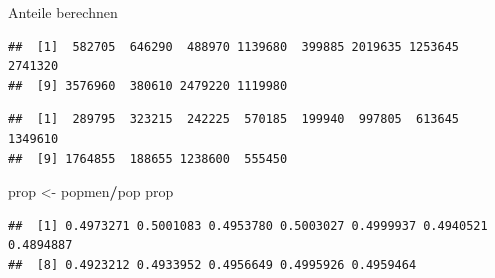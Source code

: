 \documentclass[ignorenonframetext,]{beamer}
\newenvironment{Shaded}{\begin{snugshade}}{\end{snugshade}}
\newcommand{\StringTok}[1]{\textcolor[rgb]{0.31,0.60,0.02}{#1}}
\newcommand{\OperatorTok}[1]{\textcolor[rgb]{0.81,0.36,0.00}{\textbf{#1}}}
\newcommand{\NormalTok}[1]{#1}
\begin{document}
\begin{frame}[fragile]{Anteile berechnen}

\begin{Shaded}
\end{Shaded}

\begin{verbatim}
##  [1]  582705  646290  488970 1139680  399885 2019635 1253645 2741320
##  [9] 3576960  380610 2479220 1119980
\end{verbatim}

\begin{Shaded}
\end{Shaded}

\begin{verbatim}
##  [1]  289795  323215  242225  570185  199940  997805  613645 1349610
##  [9] 1764855  188655 1238600  555450
\end{verbatim}

\begin{Shaded}
\begin{Highlighting}[]
\NormalTok{prop <-}\StringTok{ }\NormalTok{popmen}\OperatorTok{/}\NormalTok{pop}
\NormalTok{prop}
\end{Highlighting}
\end{Shaded}

\begin{verbatim}
##  [1] 0.4973271 0.5001083 0.4953780 0.5003027 0.4999937 0.4940521 0.4894887
##  [8] 0.4923212 0.4933952 0.4956649 0.4995926 0.4959464
\end{verbatim}

\end{frame}
\end{document}
